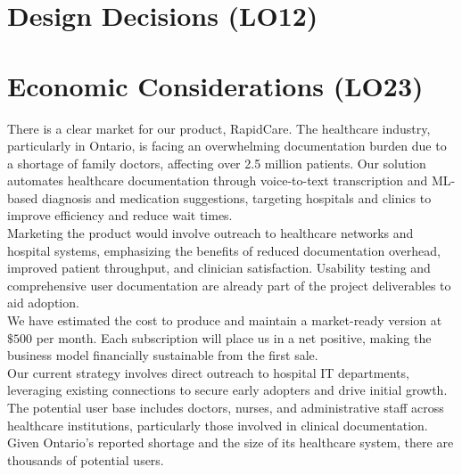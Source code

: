 \documentclass{article}
\begin{document}

\section{Design Decisions (LO12)}


 \section{Economic Considerations (LO23)}

 There is a clear market for our product, RapidCare. The healthcare industry, particularly in Ontario, is facing an overwhelming documentation burden due to a shortage of family doctors, affecting over 2.5 million patients. Our solution automates healthcare documentation through voice-to-text transcription and ML-based diagnosis and medication suggestions, targeting hospitals and clinics to improve efficiency and reduce wait times. \\
 
 
 \noindent
 Marketing the product would involve outreach to healthcare networks and hospital systems, emphasizing the benefits of reduced documentation overhead, improved patient throughput, and clinician satisfaction. Usability testing and comprehensive user documentation are already part of the project deliverables to aid adoption. \\
 
 
 \noindent
 We have estimated the cost to produce and maintain a market-ready version at $\$500$ per month. Each subscription will place us in a net positive, making the business model financially sustainable from the first sale. \\
 
 \noindent
 Our current strategy involves direct outreach to hospital IT departments, leveraging existing connections to secure early adopters and drive initial growth. The potential user base includes doctors, nurses, and administrative staff across healthcare institutions, particularly those involved in clinical documentation. Given Ontario’s reported shortage and the size of its healthcare system, there are thousands of potential users.
 
\end{document}
